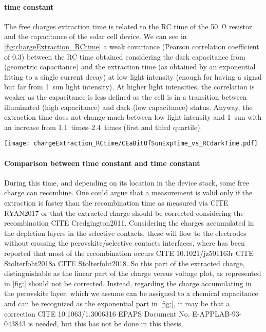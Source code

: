 \paragraph{ time constant}
The free charges extraction time is related to the RC time of the \SI{50}{\ohm} resistor and the capacitance of the solar cell device. We can see in \cref{fig:chargeExtraction_RCtime} a weak covariance (Pearson correlation coefficient of 0.3) between the RC time obtained considering the dark capacitance from  (geometric capacitance) and the extraction time (as obtained by an exponential fitting to a single  current decay) at low light intensity (enough for having a signal but far from 1~sun light intensity). At higher light intensities, the correlation is weaker as the capacitance is less defined as the cell is in a transition between illuminated (high capacitance) and dark (low capacitance) status. Anyway, the extraction time does not change much between low light intensity and 1~sun with an increase from \SIrange{1.1}{2.4}{times} (first and third quartile).

\begin{SCfigure}%
	\centering
	\texttt{[image: chargeExtraction\_RCtime/CEaBitOfSunExpTime\_vs\_RCdarkTime.pdf]}
	\label{fig:chargeExtraction_RCtime}
\end{SCfigure}

\paragraph{Comparison between  time constant and  time constant}
During this time, and depending on its location in the device stack, some free charge can recombine. One could argue that a  measurement is valid only if the extraction is faster than the recombination time as measured via CITE RYAN2017 or that the extracted charge should be corrected considering the recombination CITE Credgington2011. Considering the charges accumulated in the depletion layers in the selective contacts, these will flow to the electrodes without crossing the perovskite/selective contacts interfaces, where has been reported that most of the recombination occurs CITE 10.1021/jz501163r CITE Stolterfoht2018a CITE Stolterfoht2018. So this part of the extracted charge, distinguishable as the linear part of the charge versus voltage plot, as represented in \cref{fig:} should not be corrected. Instead, regarding the charge accumulating in the perovskite layer, which we assume can be assigned to a chemical capacitance and can be recognized as the exponential part in \cref{fig:}, it may be that a correction CITE 10.1063/1.3006316 EPAPS Document No. E-APPLAB-93-043843 is needed, but this has not be done in this thesis.

